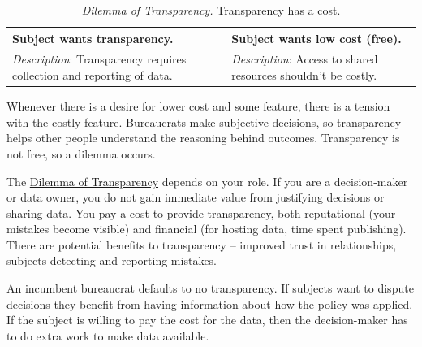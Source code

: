 \begin{center}
\begin{table}[H] %
\begin{tabular}{ | m{\dilemmatablewidth}| m{\dilemmatablewidth} | } 
  \hline
  \textbf{Subject wants transparency.} &
  \textbf{Subject wants low cost (free).} \\
  \hline
  \textit{Description}: Transparency requires collection and reporting of data. & 
  \textit{Description}: Access to shared resources shouldn't be costly. \\
  \hline
\end{tabular}
\caption{\textit{Dilemma of Transparency.}
Transparency has a cost.
}
\label{table:dilemma-subject-transparency}
\end{table}
\end{center}

Whenever there is a desire for lower cost and some feature, there is a tension with the costly feature. Bureaucrats make subjective decisions, so transparency helps other people understand the reasoning behind outcomes. Transparency is not free, so a dilemma occurs. 


The \hyperref[table:dilemma-subject-transparency]{Dilemma of Transparency} depends on your role. If you are a decision-maker or data owner, you do not gain immediate value from justifying decisions or sharing data. You pay a cost to provide transparency, both reputational (your mistakes become visible) and financial (for hosting data, time spent publishing). There are potential benefits to transparency -- improved trust in relationships, subjects detecting and reporting mistakes. 

An incumbent bureaucrat defaults to no transparency. If subjects want to dispute decisions they benefit from having information about how the policy was applied. If the subject is willing to pay the cost for the data, then the decision-maker has to do extra work to make data available.


